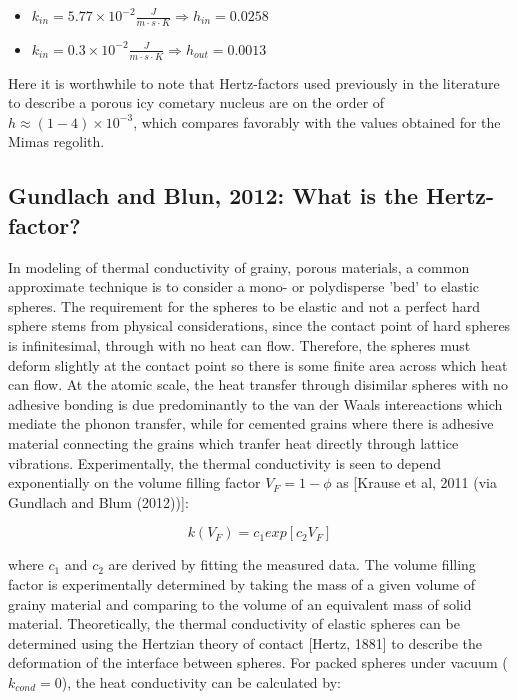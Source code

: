 \documentclass[11pt]{article} %
\newcommand{\vf}{\ensuremath{V_{F}}\xspace}
\begin{document}
	\begin{itemize}
	\item $k_{in} = 5.77\times10^{-2} \frac{J}{m \cdot s \cdot K} \Rightarrow h_{in} = 0.0258$
	\item $k_{in} = 0.3\times10^{-2} \frac{J}{m \cdot s \cdot K} \Rightarrow h_{out} = 0.0013$
	\end{itemize}
	
	Here it is worthwhile to note that Hertz-factors used previously in the literature to describe a porous icy cometary nucleus are on the order of  $h  \approx (1 - 4) \times10^{-3}$, which compares favorably with the values obtained for the Mimas regolith. 
	
\subsection{Gundlach and Blun, 2012: What is the Hertz-factor?}
	
	In modeling of thermal conductivity of grainy, porous materials, a common approximate technique is to consider a mono- or polydisperse 'bed' to elastic spheres. The requirement for the spheres to be elastic and not a perfect hard sphere stems from physical considerations, since the contact point of hard spheres is infinitesimal, through with no heat can flow. Therefore, the spheres must deform slightly at the contact point so there is some finite area across which heat can flow. At the atomic scale, the heat transfer through disimilar spheres with no adhesive bonding is due predominantly to the van der Waals intereactions which mediate the phonon transfer, while for cemented grains where there is adhesive material connecting the grains which tranfer heat directly through lattice vibrations. 
	Experimentally, the thermal conductivity is seen to depend exponentially on the volume filling factor $\vf = 1- \phi$ as [Krause et al, 2011 (via Gundlach and Blum (2012))]:
	
	\begin{equation}
	k(\vf) = c_{1} exp [c_{2} \vf]
	\end{equation}

	where $c_{1}$ and $c_{2}$ are derived by fitting the measured data. The volume filling factor is experimentally determined by taking the mass of a given volume of grainy material and comparing to the volume of an equivalent mass of solid material. Theoretically, the thermal conductivity of elastic spheres can be determined using the Hertzian theory of contact [Hertz, 1881] to describe the deformation of the interface between spheres. For packed spheres under vacuum ($k_{cond} = 0$), the heat conductivity can be calculated by:
	
\end{document}
